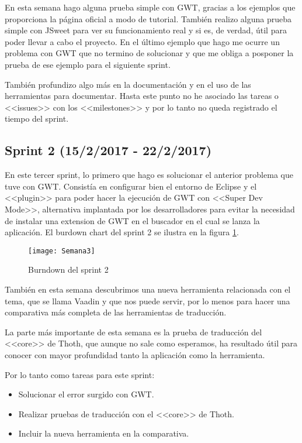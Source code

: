 En esta semana hago alguna prueba simple con GWT, gracias a los ejemplos que proporciona la página oficial a modo de tutorial. También realizo alguna prueba simple con JSweet para ver su funcionamiento real y si es, de verdad, útil para poder llevar a cabo el proyecto. En el último ejemplo que hago me ocurre un problema con GWT que no termino de solucionar y que me obliga a posponer la prueba de ese ejemplo para el siguiente sprint.

También profundizo algo más en la documentación y en el uso de las herramientas para documentar. Hasta este punto no he asociado las tareas o <<issues>> con los <<milestones>> y por lo tanto no queda registrado el tiempo del sprint.

\subsection{Sprint 2 (15/2/2017 - 22/2/2017)}

En este tercer sprint, lo primero que hago es solucionar el anterior problema que tuve con GWT. Consistía en configurar bien el entorno de Eclipse y el <<plugin>> para poder hacer la ejecución de GWT con <<Super Dev Mode>>, alternativa implantada por los desarrolladores para evitar la necesidad de instalar una extension de GWT en el buscador en el cual se lanza la aplicación. El burdown chart del sprint 2 se ilustra en la figura \ref{fig:A.1}.

\begin{figure}[h]
\centering
\texttt{[image: Semana3]}
\caption{Burndown del sprint 2}
\label{fig:A.1}
\end{figure}

También en esta semana descubrimos una nueva herramienta relacionada con el tema, que se llama Vaadin y que nos puede servir, por lo menos para hacer una comparativa más completa de las herramientas de traducción. 

La parte más importante de esta semana es la prueba de traducción del <<core>> de Thoth, que aunque no sale como esperamos, ha resultado útil para conocer con mayor profundidad tanto la aplicación como la herramienta.

Por lo tanto como tareas para este sprint:

\begin{itemize}
\item Solucionar el error surgido con GWT.
\item Realizar pruebas de traducción con el <<core>> de Thoth.
\item Incluir la nueva herramienta en la comparativa.
\end{itemize}

